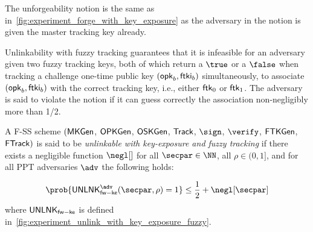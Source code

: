 The unforgeability notion is the same as in~\cref{fig:experiment_forge_with_key_exposure} as the adversary in the notion is given the master tracking key already. 

Unlinkability with fuzzy tracking guarantees that it is infeasible for an adversary given two fuzzy tracking keys, both of which return a $\true$ or a $\false$ when tracking a challenge one-time public key $(\mathsf{opk}_b,\mathsf{ftki}_b)$ simultaneously, to associate $(\mathsf{opk}_b,\mathsf{ftki}_b)$ with the correct tracking key, i.e., either $\mathsf{ftk}_0$ or $\mathsf{ftk}_1$.
The adversary is said to violate the notion if it can guess correctly the association non-negligibly more than 1/2.


\begin{definition}
\label{def:unlink-with-key-fuzzy}
A F-SS scheme  $(\mathsf{MKGen}$, $\mathsf{OPKGen}$, $\mathsf{OSKGen}$, $\mathsf{Track}$, $\sign$, $\verify$, $\mathsf{FTKGen}$, $\mathsf{FTrack})$ is said to be \emph{unlinkable with key-exposure and fuzzy tracking} if there exists a negligible function $\negl[]$ for all $\secpar \in \NN$, all $\rho \in (0,1]$, and for all PPT adversaries $\adv$ the following holds:

\[ \prob{\unlinkfwke^\adv(\secpar, \rho)=1} \le \frac{1}{2} + \negl[\secpar]\]
where $\mathsf{UNLNK}_\mathsf{fw-ke}$ is defined in~\cref{fig:experiment_unlink_with_key_exposure_fuzzy}.
\end{definition}

